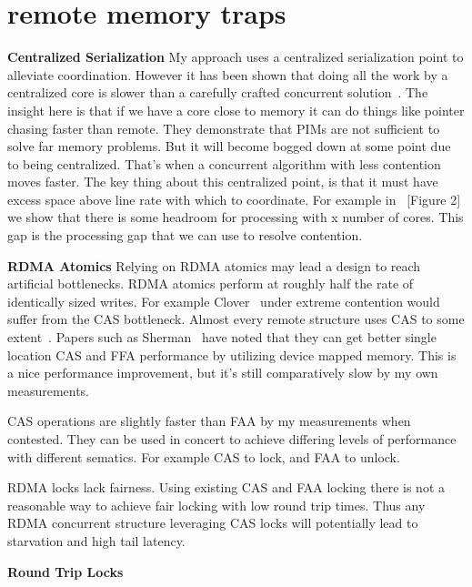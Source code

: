 \section{remote memory traps}

\textbf{Centralized Serialization} My approach uses a centralized serialization
point to alleviate coordination. However it has been shown that doing all the
work by a centralized core is slower than a carefully crafted concurrent
solution~\cite{near-memory-structs}. The insight here is that if we have a core
close to memory it can do things like pointer chasing faster than remote. They
demonstrate that PIMs are not sufficient to solve far memory problems. But it
will become bogged down at some point due to being centralized. That's when a
concurrent algorithm with less contention moves faster. The key thing about this
centralized point, is that it must have excess space above line rate with which
to coordinate. For example in ~\cite{fairnic}[Figure 2] we show that there is
some headroom for processing with x number of cores. This gap is the processing
gap that we can use to resolve contention.

\textbf{RDMA Atomics} Relying on RDMA atomics may lead a design to reach
artificial bottlenecks. RDMA atomics perform at roughly half the rate of
identically sized writes. For example Clover~\cite{clover} under extreme
contention would suffer from the CAS bottleneck. Almost every remote structure
uses CAS to some extent~. Papers such as
Sherman~\cite{sherman} have noted that they can get better single location CAS
and FFA performance by utilizing device mapped memory. This is a nice
performance improvement, but it's still comparatively slow by my own
measurements.

CAS operations are slightly faster than FAA by my measurements when contested.
They can be used in concert to achieve differing levels of performance with
different sematics. For example CAS to lock, and FAA to unlock.

RDMA locks lack fairness. Using existing CAS and FAA locking there is not a
reasonable way to achieve fair locking with low round trip times. Thus any RDMA
concurrent structure leveraging CAS locks will potentially lead to starvation
and high tail latency.

\textbf{Round Trip Locks}

